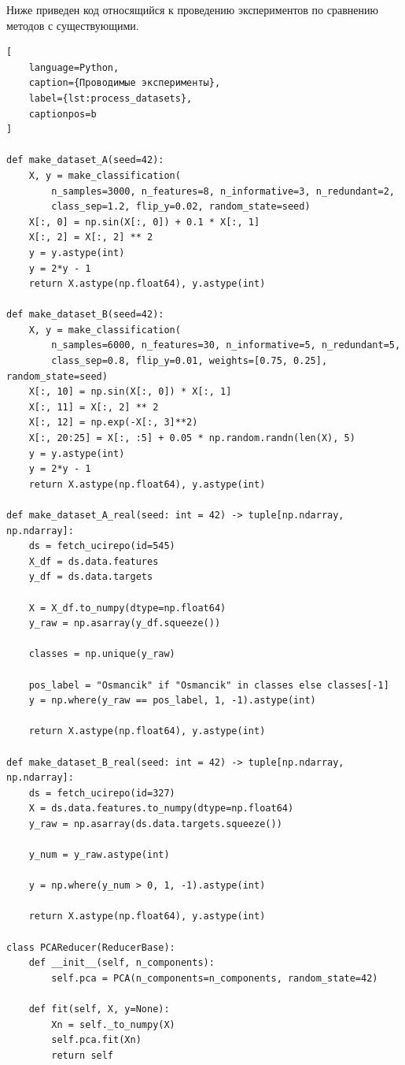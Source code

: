 \documentclass[12pt,a4paper]{article}
\begin{document}
Ниже приведен код относящийся к проведению экспериментов по сравнению методов с существующими.

\begin{lstlisting}[
    language=Python,
    caption={Проводимые эксперименты},
    label={lst:process_datasets},
    captionpos=b
]

def make_dataset_A(seed=42):
    X, y = make_classification(
        n_samples=3000, n_features=8, n_informative=3, n_redundant=2,
        class_sep=1.2, flip_y=0.02, random_state=seed)
    X[:, 0] = np.sin(X[:, 0]) + 0.1 * X[:, 1]
    X[:, 2] = X[:, 2] ** 2
    y = y.astype(int)
    y = 2*y - 1
    return X.astype(np.float64), y.astype(int)

def make_dataset_B(seed=42):
    X, y = make_classification(
        n_samples=6000, n_features=30, n_informative=5, n_redundant=5,
        class_sep=0.8, flip_y=0.01, weights=[0.75, 0.25], random_state=seed)
    X[:, 10] = np.sin(X[:, 0]) * X[:, 1]
    X[:, 11] = X[:, 2] ** 2
    X[:, 12] = np.exp(-X[:, 3]**2)
    X[:, 20:25] = X[:, :5] + 0.05 * np.random.randn(len(X), 5)
    y = y.astype(int)
    y = 2*y - 1
    return X.astype(np.float64), y.astype(int)

def make_dataset_A_real(seed: int = 42) -> tuple[np.ndarray, np.ndarray]:
    ds = fetch_ucirepo(id=545) 
    X_df = ds.data.features
    y_df = ds.data.targets

    X = X_df.to_numpy(dtype=np.float64)
    y_raw = np.asarray(y_df.squeeze()) 

    classes = np.unique(y_raw)

    pos_label = "Osmancik" if "Osmancik" in classes else classes[-1]
    y = np.where(y_raw == pos_label, 1, -1).astype(int)

    return X.astype(np.float64), y.astype(int)

def make_dataset_B_real(seed: int = 42) -> tuple[np.ndarray, np.ndarray]:
    ds = fetch_ucirepo(id=327) 
    X = ds.data.features.to_numpy(dtype=np.float64)
    y_raw = np.asarray(ds.data.targets.squeeze())

    y_num = y_raw.astype(int)

    y = np.where(y_num > 0, 1, -1).astype(int)

    return X.astype(np.float64), y.astype(int)

class PCAReducer(ReducerBase):
    def __init__(self, n_components):
        self.pca = PCA(n_components=n_components, random_state=42)

    def fit(self, X, y=None):
        Xn = self._to_numpy(X)
        self.pca.fit(Xn)
        return self


\end{lstlisting}
\end{document}
